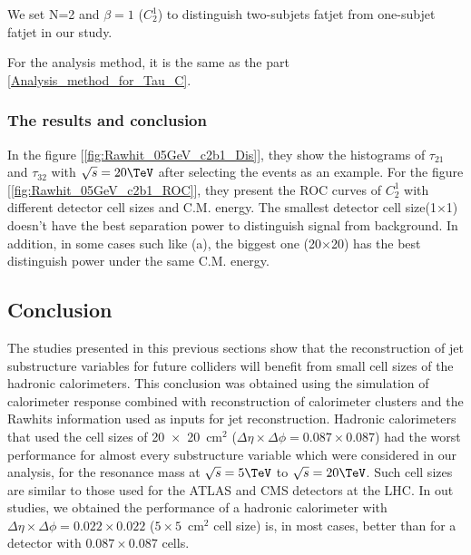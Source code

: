 \documentclass[12pt,twoside,a4paper,an,final]{cms-tdr}
\begin{document}
We set N=2 and $\beta=1$ ($C_{2}^{1}$) to distinguish two-subjets fatjet from one-subjet fatjet in our study.

For the analysis method, it is the same as the part \ref{Analysis_method_for_Tau_C}.

\subsubsection{The results and conclusion}
In the figure [\ref{fig:Rawhit_05GeV_c2b1_Dis}], they show the histograms of $\tau_{21}$ and $\tau_{32}$ with $\sqrt{s} = 20\TeV$ after selecting the events as an example. For the figure [\ref{fig:Rawhit_05GeV_c2b1_ROC}], they present the ROC curves of $C_{2}^{1}$ with different detector cell sizes and C.M. energy. The smallest detector cell size(1$\times$1) doesn't have the best separation power to distinguish signal from background. In addition, in some cases such like (a), the biggest one (20$\times$20) has the best distinguish power under the same C.M. energy.\\

\subsection{Conclusion}
The studies presented in this previous sections show that the reconstruction of jet substructure 
variables for future colliders will benefit from small cell sizes of the hadronic calorimeters. 
This conclusion was obtained using the simulation of calorimeter response combined with reconstruction of 
calorimeter clusters and the Rawhits information used as inputs for jet reconstruction. 
Hadronic calorimeters that used the cell sizes of 20~$\times $~20~cm$^2$ ($\Delta \eta \times \Delta \phi = 0.087\times 0.087$) 
had the worst performance for almost every 
substructure variable which were considered in our analysis, for the resonance mass at $\sqrt{s} = 5\TeV$ to $\sqrt{s} = 20\TeV$. 
Such cell sizes are similar to those used for the ATLAS and CMS detectors at the LHC. 
In out studies, we obtained the performance of a hadronic calorimeter with 
$\Delta \eta \times \Delta \phi = 0.022\times0.022$ ($5 \times 5$~$\mathrm{cm}^2$ cell size) is, in most cases,
better than for a detector with $0.087\times 0.087$ cells.
\end{document}

